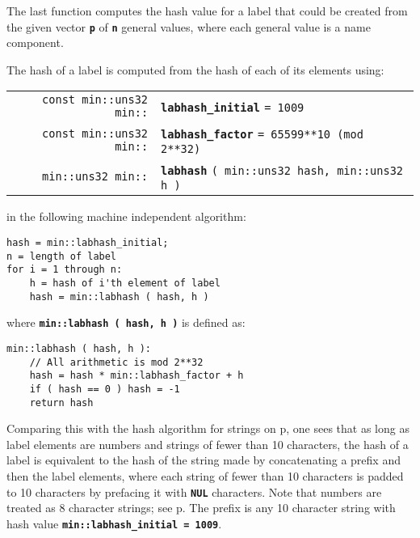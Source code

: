 \documentclass[12pt]{article}
\makeatletter
\newcommand{\TT}[1]{{\tt \bfseries #1}}
\newcommand{\ttindex}[1]{\index{#1@{\tt #1}}}
\newcommand{\pagref}[1]{p\pageref{#1}}
\newcommand{\EOL}{\penalty \exhyphenpenalty}
\newenvironment{indpar}[1][0.3in]%
	{\begin{list}{}%
		     {\setlength{\itemsep}{0in}%
		      \setlength{\topsep}{0in}%
		      \setlength{\parsep}{1ex}%
		      \setlength{\labelwidth}{#1}%
		      \setlength{\leftmargin}{#1}%
		      \addtolength{\leftmargin}{\labelsep}}%
	 \item}%
	{\end{list}}
\newcommand{\LABEL}[1]{\label{#1}}
\newcommand{\MINKEY}[1]%
	   {\TT{#1}\ttindex{min::#1}\ttindex{#1}}
\makeatother
\begin{document}
The last function computes the hash value for a label that could be created
from the given vector \TT{p} of \TT{n} general values, where each
general value is a name component.

The hash of a label is computed from
the hash of each of its elements using:

\begin{indpar}\begin{tabular}{r@{}l}
\verb|const min::uns32 min::| & \MINKEY{labhash\_initial} \verb|= 1009|
\LABEL{MIN::LABHASH_INITIAL} \\
\verb|const min::uns32 min::| & \MINKEY{labhash\_factor}
    \verb|= 65599**10 (mod 2**32)|
\LABEL{MIN::LABHASH_FACTOR} \\
\verb|min::uns32 min::| & \MINKEY{labhash}
     \verb|( min::uns32 hash, min::uns32 h )|
\LABEL{MIN::LABHASH_INCREMENTAL} \\
\end{tabular}\end{indpar}

in the following machine independent algorithm:\label{LABEL-HASH-ALGORITHM}

\begin{indpar}\begin{verbatim}
hash = min::labhash_initial;
n = length of label
for i = 1 through n:
    h = hash of i'th element of label
    hash = min::labhash ( hash, h )
\end{verbatim}\end{indpar}

where \TT{min::labhash ( hash, h )} is defined as:

\begin{indpar}\begin{verbatim}
min::labhash ( hash, h ):
    // All arithmetic is mod 2**32
    hash = hash * min::labhash_factor + h
    if ( hash == 0 ) hash = -1
    return hash
\end{verbatim}\end{indpar}

Comparing this with the hash algorithm for strings
on \pagref{HASH-ALGORITHM}, one sees that as long as
label elements are numbers and strings of fewer than 10 characters,
the hash of a label is equivalent to the hash of the
string made by concatenating a prefix and then the label elements, where each
string of fewer than 10 characters is padded to 10 characters
by prefacing it with \TT{NUL} characters.  Note that
numbers are treated as 8 character strings; see
\pagref{NUMBER-HASH-ALGORITHM}.  The prefix is any 10 character string with
hash value \TT{min::\EOL labhash\_\EOL initial = 1009}.
\end{document}
